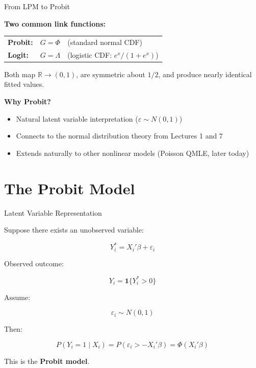 \documentclass[aspectratio=169]{beamer}
\numberwithin{equation}{section}
\begin{document}
\begin{frame}{From LPM to Probit}

\textbf{Two common link functions:}

\medskip

\begin{tabular}{lll}
\textbf{Probit:} & $G = \Phi$ & (standard normal CDF) \\
\textbf{Logit:} & $G = \Lambda$ & (logistic CDF: $e^x/(1+e^x)$)
\end{tabular}

\pause

\bigskip

Both map $\mathbb{R} \to (0,1)$, are symmetric about $1/2$, and produce nearly identical fitted values.

\pause

\bigskip

\textbf{Why Probit?}
\begin{itemize}
    \item Natural latent variable interpretation ($\varepsilon \sim N(0,1)$)
    \item Connects to the normal distribution theory from Lectures 1 and 7
    \item Extends naturally to other nonlinear models (Poisson QMLE, later today)
\end{itemize}

\end{frame}

\section{The Probit Model}

\begin{frame}{Latent Variable Representation}

Suppose there exists an unobserved variable:

\[
Y_i^* = X_i'\beta + \varepsilon_i
\]

\pause

Observed outcome:

\[
Y_i = \mathbf{1}\{Y_i^* > 0\}
\]

\pause

Assume:

\[
\varepsilon_i \sim N(0,1)
\]

\pause

Then:

\[
P(Y_i=1 \mid X_i)
=
P(\varepsilon_i > -X_i'\beta)
=
\Phi(X_i'\beta)
\]

\pause

This is the \textbf{Probit model}.
\end{frame}
\end{document}
